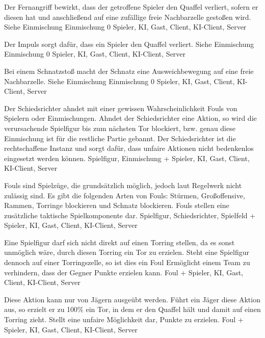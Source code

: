         {Der Fernangriff bewirkt, dass der getroffene Spieler den Quaffel verliert, sofern er diesen hat und anschließend auf eine zufällige freie Nachbarzelle gestoßen wird.}
        {Siehe Einmischung}
        {Einmischung}
        {0}
        {Spieler, KI, Gast, Client, KI-Client, Server}

        {Der Impuls sorgt dafür, dass ein Spieler den Quaffel verliert.}
        {Siehe Einmischung}
        {Einmischung}
        {0}
        {Spieler, KI, Gast, Client, KI-Client, Server}

        {Bei einem Schnatzstoß macht der Schnatz eine Ausweichbewegung auf eine freie Nachbarzelle.}
        {Siehe Einmischung}
        {Einmischung}
        {0}
        {Spieler, KI, Gast, Client, KI-Client, Server}
        
        {Der Schiedsrichter ahndet mit einer gewissen Wahrscheinlichkeit Fouls von Spielern oder Einmischungen. Ahndet der Schiedsrichter eine Aktion, so wird die verursachende Spielfigur bis zum nächsten Tor blockiert, bzw. genau diese Einmischung ist für die restliche Partie gebannt.}
        {Der Schiedsrichter ist die rechtschaffene Instanz und sorgt dafür, dass unfaire Aktionen nicht bedenkenlos eingesetzt werden können.}
        {Spielfigur, Einmischung}
        {+}
        {Spieler, KI, Gast, Client, KI-Client, Server}

        {Fouls sind Spielzüge, die grundsätzlich möglich, jedoch laut Regelwerk nicht zulässig sind. Es gibt die folgenden Arten von Fouls: Stürmen, Großoffensive, Rammen, Torringe blockieren und Schnatz blockieren.}
        {Fouls stellen eine zusätzliche taktische Spielkomponente dar.}
        {Spielfigur, Schiedsrichter, Spielfeld}
        {+}
        {Spieler, KI, Gast, Client, KI-Client, Server}

        {Eine Spielfigur darf sich nicht direkt auf einen Torring stellen, da es sonst unmöglich wäre, durch diesen Torring ein Tor zu erzielen. Steht eine Spielfigur dennoch auf einer Torringszelle, so ist dies ein Foul}
        {Ermöglicht einem Team zu verhindern, dass der Gegner Punkte erzielen kann.}
        {Foul}
        {+}
        {Spieler, KI, Gast, Client, KI-Client, Server}

        {Diese Aktion kann nur von Jägern ausgeübt werden. Führt ein Jäger diese Aktion aus, so erzielt er zu 100\% ein Tor, in dem er den Quaffel hält und damit auf einen Torring zieht.}
        {Stellt eine unfaire Möglichkeit dar, Punkte zu erzielen.}
        {Foul}
        {+}
        {Spieler, KI, Gast, Client, KI-Client, Server}

